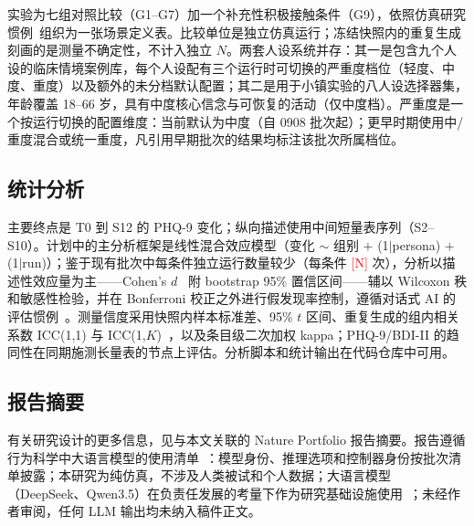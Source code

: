 \documentclass[11pt,a4paper]{article}
\newcommand{\ph}[1]{\textcolor{red}{[#1]}}
\begin{document}
实验为七组对照比较（G1--G7）加一个补充性积极接触条件（G9），依照仿真研究惯例~\cite{crosland2025}组织为一张场景定义表。比较单位是独立仿真运行；冻结快照内的重复生成刻画的是测量不确定性，不计入独立 $N$。两套人设系统并存：其一是包含九个人设的临床情境案例库，每个人设配有三个运行时可切换的严重度档位（轻度、中度、重度）以及额外的未分档默认配置；其二是用于小镇实验的八人设选择器集，年龄覆盖 18--66 岁，具有中度核心信念与可恢复的活动（仅中度档）。严重度是一个按运行切换的配置维度：当前默认为中度（自 0908 批次起）；更早时期使用中/重度混合或统一重度，凡引用早期批次的结果均标注该批次所属档位。

\subsection*{统计分析}

主要终点是 T0 到 S12 的 PHQ-9 变化；纵向描述使用中间短量表序列（S2--S10）。计划中的主分析框架是线性混合效应模型（变化 $\sim$ 组别 $+$ (1$|$persona) $+$ (1$|$run)）；鉴于现有批次中每条件独立运行数量较少（每条件 \ph{N} 次），分析以描述性效应量为主——Cohen's $d$~\cite{cohen1988} 附 bootstrap 95\% 置信区间——辅以 Wilcoxon 秩和敏感性检验，并在 Bonferroni 校正之外进行假发现率控制，遵循对话式 AI 的评估惯例~\cite{tu2025}。测量信度采用快照内样本标准差、95\% $t$ 区间、重复生成的组内相关系数 ICC(1,1) 与 ICC(1,$K$)~\cite{shrout1979}，以及条目级二次加权 kappa；PHQ-9/BDI-II 的趋同性在同期施测长量表的节点上评估。分析脚本和统计输出在代码仓库中可用。

\subsection*{报告摘要}

有关研究设计的更多信息，见与本文关联的 Nature Portfolio 报告摘要。报告遵循行为科学中大语言模型的使用清单~\cite{feuerriegel2026}：模型身份、推理选项和控制器身份按批次清单披露；本研究为纯仿真，不涉及人类被试和个人数据；大语言模型（DeepSeek、Qwen3.5）在负责任发展的考量下作为研究基础设施使用~\cite{stade2024}；未经作者审阅，任何 LLM 输出均未纳入稿件正文。
\end{document}
